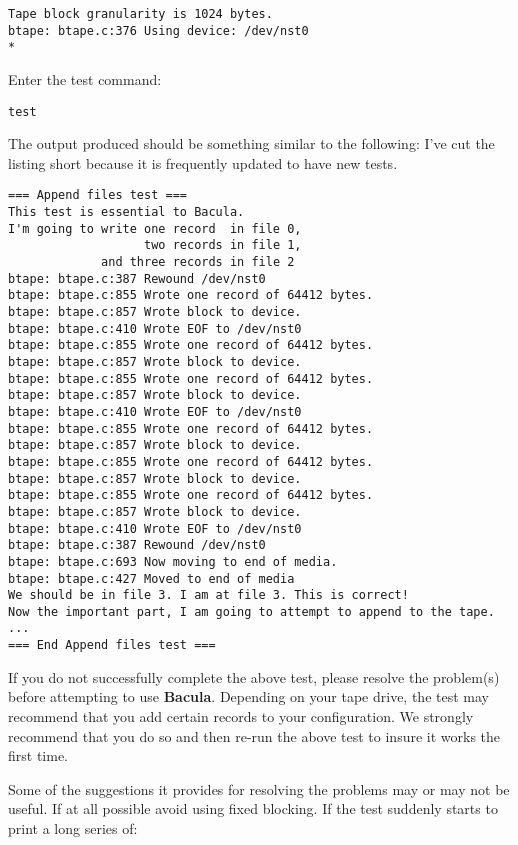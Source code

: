 \footnotesize
\begin{verbatim}
Tape block granularity is 1024 bytes.
btape: btape.c:376 Using device: /dev/nst0
*
\end{verbatim}
\normalsize

Enter the test command: 

\footnotesize
\begin{verbatim}
test
\end{verbatim}
\normalsize

The output produced should be something similar to the following: I've cut the
listing short because it is frequently updated to have new tests. 

\footnotesize
\begin{verbatim}
=== Append files test ===
This test is essential to Bacula.
I'm going to write one record  in file 0,
                   two records in file 1,
             and three records in file 2
btape: btape.c:387 Rewound /dev/nst0
btape: btape.c:855 Wrote one record of 64412 bytes.
btape: btape.c:857 Wrote block to device.
btape: btape.c:410 Wrote EOF to /dev/nst0
btape: btape.c:855 Wrote one record of 64412 bytes.
btape: btape.c:857 Wrote block to device.
btape: btape.c:855 Wrote one record of 64412 bytes.
btape: btape.c:857 Wrote block to device.
btape: btape.c:410 Wrote EOF to /dev/nst0
btape: btape.c:855 Wrote one record of 64412 bytes.
btape: btape.c:857 Wrote block to device.
btape: btape.c:855 Wrote one record of 64412 bytes.
btape: btape.c:857 Wrote block to device.
btape: btape.c:855 Wrote one record of 64412 bytes.
btape: btape.c:857 Wrote block to device.
btape: btape.c:410 Wrote EOF to /dev/nst0
btape: btape.c:387 Rewound /dev/nst0
btape: btape.c:693 Now moving to end of media.
btape: btape.c:427 Moved to end of media
We should be in file 3. I am at file 3. This is correct!
Now the important part, I am going to attempt to append to the tape.
...
=== End Append files test ===
\end{verbatim}
\normalsize

If you do not successfully complete the above test, please resolve the
problem(s) before attempting to use {\bf Bacula}. Depending on your tape
drive, the test may recommend that you add certain records to your
configuration. We strongly recommend that you do so and then re-run the above
test to insure it works the first time. 

Some of the suggestions it provides for resolving the problems may or may not
be useful. If at all possible avoid using fixed blocking. If the test suddenly
starts to print a long series of: 

